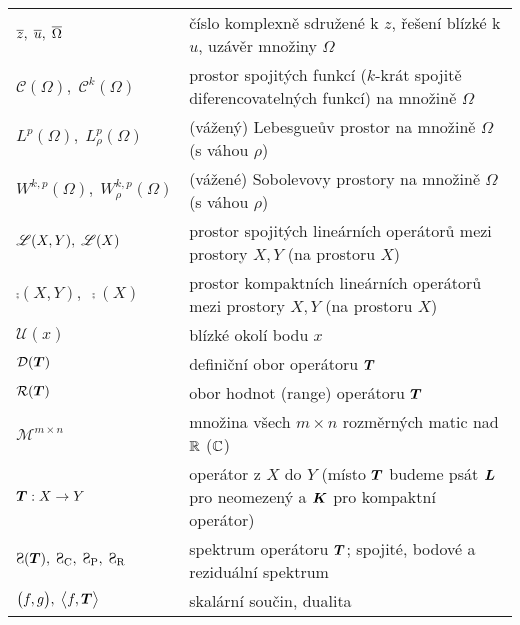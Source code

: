 
\begin{table}[h!]
\begin{tabular}{l|l}
$\overline{z}, \; \overline{u}, \; \overline{\Omega}$
& číslo komplexně sdružené k $z$, řešení blízké k $u$, uzávěr množiny $\Omega$
\\
$\mathcal{C}(\Omega), \; \mathcal{C}^k(\Omega)$
& prostor spojitých funkcí ($k$-krát spojitě diferencovatelných funkcí) na množině $\Omega$
\\
$L^p(\Omega), \; L^p_\rho(\Omega)$
& (vážený) Lebesgueův prostor na množině $\Omega$ (s váhou $\rho$)
\\
$W^{k,p}(\Omega), \; W^{k,p}_\rho(\Omega)$
& (vážené) Sobolevovy prostory na množině $\Omega$ (s váhou $\rho$)
\\
$\mathscr{L}(X, Y), \; \mathscr{L}(X)$
& prostor spojitých lineárních operátorů mezi prostory $X, Y$ (na prostoru $X$)
\\
$\comp(X, Y), \; \comp(X)$
& prostor kompaktních lineárních operátorů mezi prostory $X, Y$ (na prostoru $X$)
\\
$\mathcal{U}(x)$
& blízké okolí bodu $x$
\\
$\mathcal{D}(\boldsymbol{T})$
& definiční obor operátoru $\boldsymbol{T}$
\\
$\mathcal{R}(\boldsymbol{T})$
& obor hodnot (range) operátoru $\boldsymbol{T}$
\\
$\mathcal{M}^{m \times n}$
& množina všech $m\times n$ rozměrných matic nad $\mathbb{R}$ ($\mathbb{C}$)
\\
$\boldsymbol{T}: X \to Y$
& operátor z $X$ do $Y$ (místo $\boldsymbol{T}$ budeme psát $\boldsymbol{L}$ pro neomezený a $\boldsymbol{K}$ pro kompaktní operátor)
\\
$\Sp(\map T), \; \SpC, \; \SpP, \; \SpR$
& spektrum operátoru $\boldsymbol{T}$; spojité, bodové a reziduální spektrum
\\
$\big( f, g \big), \; \big< f, \boldsymbol{T} \big>$
& skalární součin, dualita
\end{tabular}
\end{table}